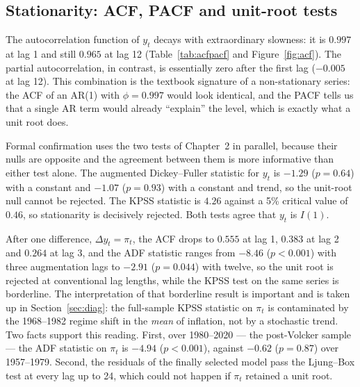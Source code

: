 

\subsection{Stationarity: ACF, PACF and unit-root tests}
\label{sec:acf}

The autocorrelation function of $y_t$ decays with extraordinary slowness: it is
$0.997$ at lag 1 and still $0.965$ at lag 12 (Table~\ref{tab:acfpacf} and
Figure~\ref{fig:acf}). The partial autocorrelation, in contrast, is essentially
zero after the first lag ($-0.005$ at lag 12). This combination is the textbook
signature of a non-stationary series: the ACF of an AR(1) with $\phi=0.997$ would
look identical, and the PACF tells us that a single AR term would already
``explain'' the level, which is exactly what a unit root does.



Formal confirmation uses the two tests of Chapter~2 in parallel, because their
nulls are opposite and the agreement between them is more informative than either
test alone. The augmented Dickey--Fuller statistic for $y_t$ is $-1.29$
($p=0.64$) with a constant and $-1.07$ ($p=0.93$) with a constant and trend, so
the unit-root null cannot be rejected. The KPSS statistic is $4.26$ against a 5\%
critical value of $0.46$, so stationarity is decisively rejected. Both tests agree
that $y_t$ is $I(1)$.

After one difference, $\Delta y_t=\pi_t$, the ACF drops to $0.555$ at lag 1,
$0.383$ at lag 2 and $0.264$ at lag 3, and the ADF statistic ranges from $-8.46$
($p<0.001$) with three augmentation lags to $-2.91$ ($p=0.044$) with twelve, so the
unit root is rejected at conventional lag lengths, while the KPSS test on the same
series is borderline. The interpretation of that borderline result is important and
is taken up in Section~\ref{sec:diag}: the full-sample KPSS statistic on $\pi_t$
is contaminated by the 1968--1982 regime shift in the \emph{mean} of inflation, not
by a stochastic trend. Two facts support this reading. First, over 1980--2020 ---
the post-Volcker sample --- the ADF statistic on $\pi_t$ is $-4.94$ ($p<0.001$),
against $-0.62$ ($p=0.87$) over 1957--1979. Second, the residuals of the finally
selected model pass the Ljung--Box test at every lag up to 24, which could not
happen if $\pi_t$ retained a unit root.



